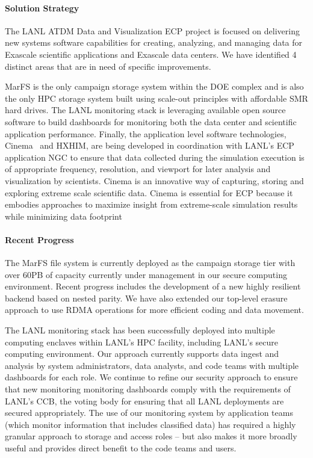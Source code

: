 \paragraph{Solution Strategy}
The LANL ATDM Data and Visualization ECP project is focused on delivering new
systems software capabilities for creating, analyzing, and managing data for
Exascale scientific applications and Exascale data centers. We have identified
4 distinct areas that are in need of specific improvements.

MarFS is the only campaign storage system within the DOE complex and is
also the only HPC storage system built using scale-out principles with affordable
SMR hard drives. The LANL monitoring stack is leveraging available open source
software to build dashboards for monitoring both the data center and
scientific application performance. Finally, the application level software
technologies, Cinema~\cite{cinema:Ahrens:SC14} and HXHIM, are being developed in coordination with
LANL's ECP application NGC to ensure that data collected during the simulation
execution is of appropriate frequency, resolution, and viewport for later
analysis and visualization by scientists. Cinema is an innovative way of
capturing, storing and exploring extreme scale scientific data. Cinema is
essential for ECP because it embodies approaches to maximize insight from
extreme-scale simulation results while minimizing data footprint 

\paragraph{Recent Progress}
The MarFS file system is currently deployed as the campaign storage tier
with over 60PB of capacity currently under management in our secure computing
environment. Recent progress includes the development of a new highly
resilient backend based on nested parity. We have also extended our top-level
erasure approach to use RDMA operations for more efficient coding and data movement.

The LANL monitoring stack has been successfully deployed into multiple
computing enclaves within LANL's HPC facility, including LANL's secure
computing environment. Our approach currently supports data ingest and
analysis by system administrators, data analysts, and code teams with multiple
dashboards for each role. We continue to refine our security approach to
ensure that new monitoring monitoring dashboards comply with the requirements
of LANL's CCB, the voting body for ensuring that all LANL deployments are
secured appropriately. The use of our monitoring system by application teams
(which monitor information that includes classified data) has required a
highly granular approach to storage and access roles -- but also makes it more
broadly useful and provides direct benefit to the code teams and users.

